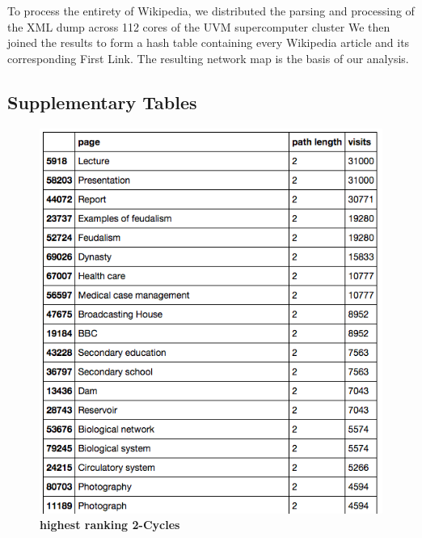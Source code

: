 \documentclass[pre,twocolumn,twoside,superscriptaddress,floatfix, aps, 10pt]{revtex4-1}
\begin{document}
To process the entirety of Wikipedia, we distributed the parsing and processing of the XML dump
across 112 cores of the UVM supercomputer cluster
\cite{vacc}
We then joined the results to form a hash table containing every Wikipedia article and its corresponding
First Link. The resulting network map is the basis of our analysis.


\subsection{Supplementary Tables}

\begin{figure}[tp!]
  \centering	
  \includegraphics[width=\columnwidth]{graphics/top_2loops.png}
  \caption{
    \textbf{highest ranking 2-Cycles}
  }
  \label{fig:Highest Ranking 2-Cyles}
\end{figure}
\end{document}
